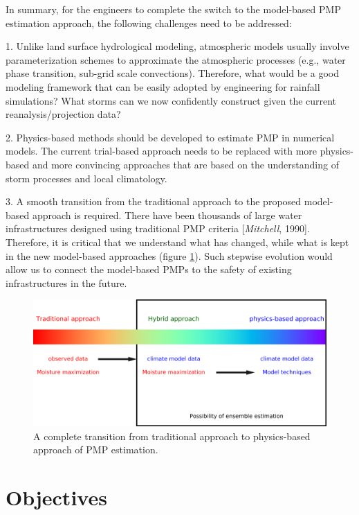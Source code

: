 \vskip 0.4in
In summary, for the engineers to complete the switch to the model-based PMP estimation approach, the following challenges need to be addressed:

1. Unlike land surface hydrological modeling, atmospheric models usually involve parameterization schemes to approximate the atmospheric processes (e.g., water phase transition, sub-grid scale convections). Therefore, what would be a good modeling framework that can be easily adopted by engineering for rainfall simulations? What storms can we now confidently construct given the current reanalysis/projection data?

2. Physics-based methods should be developed to estimate PMP in numerical models. The current trial-based approach needs to be replaced with more physics-based and more convincing approaches that are based on the understanding of storm processes and local climatology.

3. A smooth transition from the traditional approach to the proposed model-based approach is required. There have been thousands of large water infrastructures designed using traditional PMP criteria [\textit{Mitchell}, 1990]. Therefore, it is critical that we understand what has changed, while what is kept in the new model-based approaches (figure \ref{fig:1-1}). Such stepwise evolution would allow us to connect the model-based PMPs to the safety of existing infrastructures in the future.

\begin{figure}[htbp]
	\centering
	\includegraphics[width=\linewidth]{pics/ch1/fig1.png}
	\caption{A complete transition from traditional approach to physics-based approach of PMP estimation.}
    \label{fig:1-1}
\end{figure}

\section {Objectives}

